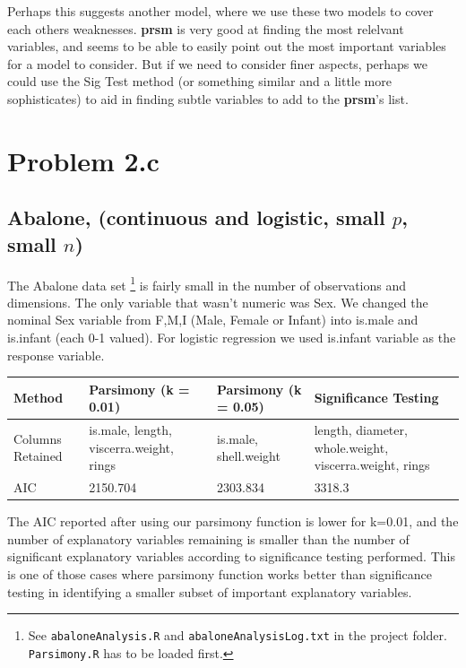 \documentclass[letter]{article}
\newcounter{foot}
\begin{document}
Perhaps this suggests another model, where we use these two models to cover each others weaknesses. \textbf{prsm} is very good at finding the most relelvant variables, and seems to be able to easily point out the most important variables for a model to consider. But if we need to consider finer aspects, perhaps we could use the Sig Test method (or something similar and a little more sophisticates) to aid in finding subtle variables to add to the \textbf{prsm}'s list.



\section{Problem 2.c}

\subsection{Abalone, \cite{abalone} (continuous and logistic, small $p$, small $n$)}

The Abalone data set \footnote{See \texttt{abaloneAnalysis.R} and \texttt{abaloneAnalysisLog.txt} in the project folder. \texttt{Parsimony.R} has to be loaded first.}
is fairly small in the number of observations and dimensions. The only variable that wasn't numeric was Sex. We changed the nominal Sex variable from F,M,I (Male, Female or Infant) into is.male and is.infant (each 0-1 valued). For logistic regression we used is.infant variable as the response variable.

\begin{center}
    \begin{tabular}{ | l |  p{4cm} |  p{4cm} | p{4cm} |}
    \hline
    Method & Parsimony (k = 0.01) & Parsimony (k = 0.05) & Significance Testing \\ \hline
    	
    Columns Retained & is.male, length, viscerra.weight, rings & is.male, shell.weight & length, diameter, whole.weight, viscerra.weight, rings\\ \hline
    
    AIC & 2150.704 & 2303.834 & 3318.3\\ \hline
    
    \end{tabular}
\end{center}

The AIC reported after using our parsimony function is lower for k=0.01, and the number of explanatory variables remaining is smaller than the number of significant explanatory variables according to significance testing performed. This is one of those cases where parsimony function works better than significance testing in identifying a smaller subset of important explanatory variables.
\end{document}
